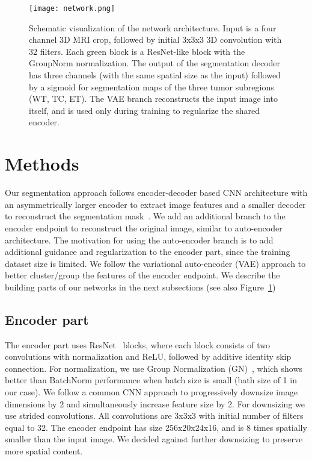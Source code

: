 \documentclass[runningheads]{llncs}
\newcommand{\0}{\ensuremath{\mathbf{0}}}
\newcommand{\1}{\ensuremath{\mathbf{1}}}
\begin{document}
 \begin{figure}[h] 
	\centering
	\texttt{[image: network.png]}
	\caption{Schematic visualization of the network architecture.  Input is a four channel 3D MRI crop, followed by initial 3x3x3 3D convolution with 32 filters. Each green block is a ResNet-like block with the GroupNorm normalization. The output of the segmentation decoder has three channels (with the same spatial size as the input) followed by a sigmoid for segmentation maps of the three tumor subregions (WT, TC, ET).  The VAE branch reconstructs the input image into itself, and is used only during training to regularize the shared encoder.}
	\label{fig:network}
	\vspace{-5mm}
\end{figure}

\section{Methods}
\label{sec:methods}

Our segmentation approach follows encoder-decoder based CNN architecture with an asymmetrically larger encoder to extract image features and a smaller decoder to reconstruct the segmentation mask~\cite{deeplabv3plus2018,deeplabv3plus2017,he2017maskrcnn,Ronneberger15,Milletari16}.  We add an additional branch to the encoder endpoint to reconstruct the original image, similar to auto-encoder architecture.  The motivation for using the auto-encoder branch is to  add additional guidance and regularization to the encoder part, since the training dataset size is limited.  We follow the variational auto-encoder (VAE) approach to better cluster/group the features of the encoder endpoint. We  describe the building parts of our networks in the next subsections (see also Figure~\ref{fig:network})


\subsection{Encoder part}
The encoder part uses  ResNet~\cite{He16}  blocks, where each block consists of two convolutions with normalization and ReLU, followed by additive identity skip connection. For normalization, we use Group Normalization (GN)~\cite{Wu18}, which shows better than BatchNorm performance when batch size is small (bath size of 1 in our case).  We follow a common CNN approach to progressively downsize image dimensions by 2 and simultaneously increase feature size by 2.  For downsizing we use strided convolutions.   All convolutions are 3x3x3 with initial number of filters equal to 32.  
The encoder endpoint has size 256x20x24x16, and is 8 times spatially smaller than the input image. We decided against further downsizing to preserve more spatial content. 
\end{document}
